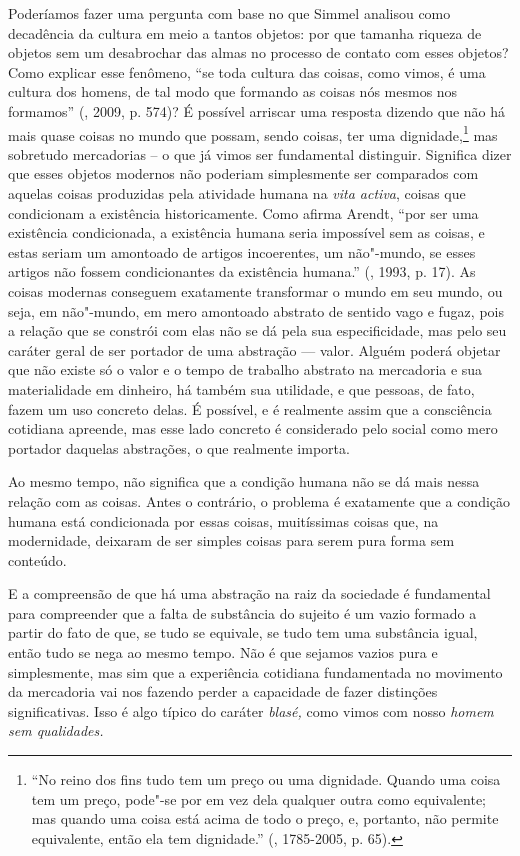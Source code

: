 Poderíamos fazer uma pergunta com base no que Simmel analisou como
decadência da cultura em meio a tantos objetos: por que tamanha riqueza
de objetos sem um desabrochar das almas no processo de contato com esses
objetos? Como explicar esse fenômeno, ``se toda cultura das coisas, como
vimos, é uma cultura dos homens, de tal modo que formando as coisas nós
mesmos nos formamos'' (, 2009, p. 574)? É possível
arriscar uma resposta dizendo que não há mais quase coisas no mundo que
possam, sendo coisas, ter uma dignidade,\footnote{``No reino dos fins
  tudo tem um preço ou uma dignidade. Quando uma coisa tem um preço,
  pode"-se por em vez dela qualquer outra como equivalente; mas quando
  uma coisa está acima de todo o preço, e, portanto, não permite
  equivalente, então ela tem dignidade.'' (, 1785-2005, p. 65).}
mas sobretudo mercadorias -- o que já vimos ser fundamental distinguir.
Significa dizer que esses objetos modernos não poderiam simplesmente ser
comparados com aquelas coisas produzidas pela atividade humana na
\emph{vita activa}, coisas que condicionam a existência historicamente.
Como afirma Arendt, ``por ser uma existência condicionada, a existência
humana seria impossível sem as coisas, e estas seriam um amontoado de
artigos incoerentes, um não"-mundo, se esses artigos não fossem
condicionantes da existência humana.'' (, 1993, p. 17). As coisas
modernas conseguem exatamente transformar o mundo em seu mundo, ou seja,
em não"-mundo, em mero amontoado abstrato de sentido vago e fugaz, pois a
relação que se constrói com elas não se dá pela sua especificidade, mas
pelo seu caráter geral de ser portador de uma abstração --- valor.
Alguém poderá objetar que não existe só o valor e o tempo de
trabalho abstrato na mercadoria e sua materialidade em dinheiro, há
também sua utilidade, e que pessoas, de fato, fazem um uso concreto
delas. É possível, e é realmente assim que a consciência cotidiana
apreende, mas esse lado concreto é considerado pelo social como mero
portador daquelas abstrações, o que realmente importa.

Ao mesmo tempo, não significa que a condição humana não se dá mais nessa
relação com as coisas. Antes o contrário, o problema é exatamente que a
condição humana está condicionada por essas coisas, muitíssimas coisas
que, na modernidade, deixaram de ser simples coisas para serem pura
forma sem conteúdo.

E a compreensão de que há uma abstração na raiz da sociedade é
fundamental para compreender que a falta de substância do sujeito é um
vazio formado a partir do fato de que, se tudo se equivale, se tudo tem
uma substância igual, então tudo se nega ao mesmo tempo. Não é que
sejamos vazios pura e simplesmente, mas sim que a experiência cotidiana
fundamentada no movimento da mercadoria vai nos fazendo perder a
capacidade de fazer distinções significativas. Isso é algo típico do
caráter \emph{blasé,} como vimos com nosso \emph{homem sem qualidades.}


